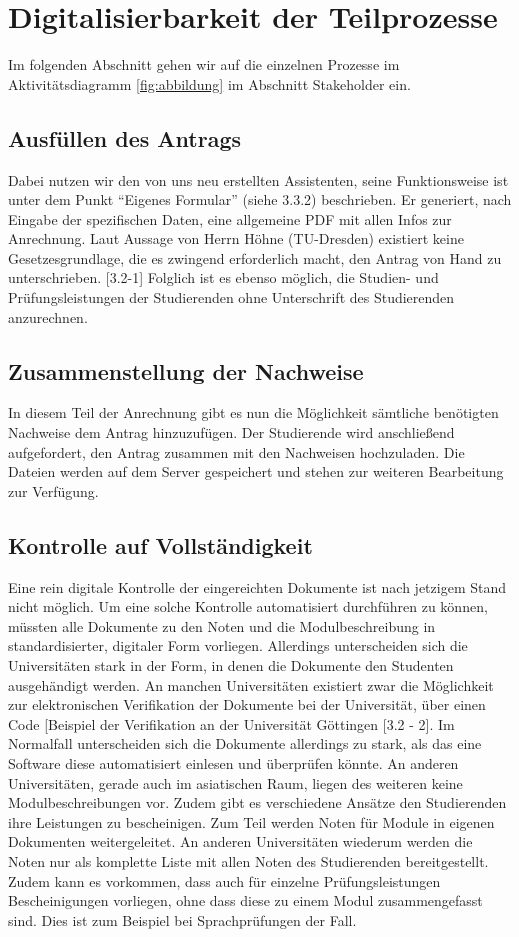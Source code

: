 \section{Digitalisierbarkeit der Teilprozesse}

Im folgenden Abschnitt gehen wir auf die einzelnen Prozesse im Aktivitätsdiagramm \cref{fig:abbildung} im Abschnitt Stakeholder ein.

\subsection{Ausfüllen des Antrags}
Dabei nutzen wir den von uns neu erstellten Assistenten, seine Funktionsweise ist unter dem Punkt “Eigenes Formular” (siehe 3.3.2) beschrieben. Er generiert, nach Eingabe der spezifischen Daten, eine allgemeine PDF mit allen Infos zur Anrechnung. Laut Aussage von Herrn Höhne (TU-Dresden) existiert keine Gesetzesgrundlage, die es zwingend erforderlich macht, den Antrag von Hand zu unterschrieben. [3.2-1] Folglich ist es ebenso möglich, die Studien- und Prüfungsleistungen der Studierenden ohne Unterschrift des Studierenden anzurechnen.

\subsection{Zusammenstellung der Nachweise}
In diesem Teil der Anrechnung gibt es nun die Möglichkeit sämtliche benötigten Nachweise dem Antrag hinzuzufügen. Der Studierende wird anschließend aufgefordert, den Antrag zusammen mit den Nachweisen hochzuladen. Die Dateien werden auf dem Server gespeichert und stehen zur weiteren Bearbeitung zur Verfügung.

\subsection{Kontrolle auf Vollständigkeit}
Eine rein digitale Kontrolle der eingereichten Dokumente ist nach jetzigem Stand nicht möglich. Um eine solche Kontrolle automatisiert durchführen zu können, müssten alle Dokumente zu den Noten und die Modulbeschreibung in standardisierter,  digitaler Form vorliegen. Allerdings unterscheiden sich die Universitäten stark in der Form, in denen die Dokumente den Studenten ausgehändigt werden. An manchen Universitäten existiert zwar die Möglichkeit zur elektronischen Verifikation der Dokumente bei der Universität, über einen Code [Beispiel der Verifikation an der Universität Göttingen [3.2 - 2]. Im Normalfall unterscheiden sich die Dokumente allerdings zu stark, als das eine Software diese automatisiert einlesen und überprüfen könnte. An anderen Universitäten, gerade auch im asiatischen Raum, liegen des weiteren keine Modulbeschreibungen vor. Zudem gibt es verschiedene Ansätze den Studierenden ihre Leistungen zu bescheinigen. Zum Teil werden Noten für Module in eigenen Dokumenten weitergeleitet. An anderen Universitäten wiederum werden die Noten nur als komplette Liste mit allen Noten des Studierenden bereitgestellt. Zudem kann es vorkommen, dass auch für einzelne Prüfungsleistungen Bescheinigungen vorliegen, ohne dass diese zu einem Modul zusammengefasst sind. Dies ist zum Beispiel bei Sprachprüfungen der Fall. 

